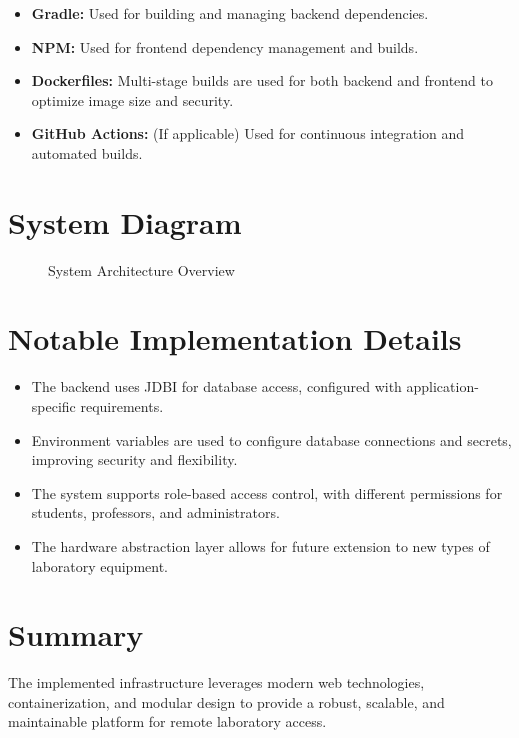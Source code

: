 \begin{itemize}
    \item \textbf{Gradle:} Used for building and managing backend dependencies.
    \item \textbf{NPM:} Used for frontend dependency management and builds.
    \item \textbf{Dockerfiles:} Multi-stage builds are used for both backend and frontend to optimize image size and security.
    \item \textbf{GitHub Actions:} (If applicable) Used for continuous integration and automated builds.
\end{itemize}

\section{System Diagram}

\begin{figure}[h]
    \begin{center}
    \end{center}
    \caption{System Architecture Overview}
    \label{fig:system-architecture}
\end{figure}

\section{Notable Implementation Details}

\begin{itemize}
    \item The backend uses JDBI for database access, configured with application-specific requirements.
    \item Environment variables are used to configure database connections and secrets, improving security and flexibility.
    \item The system supports role-based access control, with different permissions for students, professors, and administrators.
    \item The hardware abstraction layer allows for future extension to new types of laboratory equipment.
\end{itemize}

\section{Summary}

The implemented infrastructure leverages modern web technologies, containerization, and modular design to provide a robust, scalable, and maintainable platform for remote laboratory access.